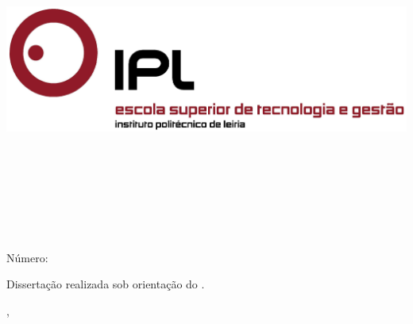 
\begin{titlepage}

\begin{center}

\hfill

\includegraphics[width=\textwidth]{Covers/estg_h.png} \\

\bigskip
\large
\myFaculty \\
\mySchool \\ 
\myDepartment \\
\myDegree \\



\begingroup
\color{Maroon}

\vspace{4cm}

\spacedallcaps{\myTitle} \\ \bigskip %
\endgroup

\vspace{4cm}



\spacedlowsmallcaps{\myNameOne}\\
Número: \myNumber \\
\bigskip %

\vfill

\end{center}

\begin{normalsize}
    
    \noindent Dissertação realizada sob orientação do \myProfOne.

\end{normalsize}
\vspace{1cm}

\begin{center}

\myLocation, \myTime\ %
    
\end{center}




\end{titlepage}

\cleardoublepage

